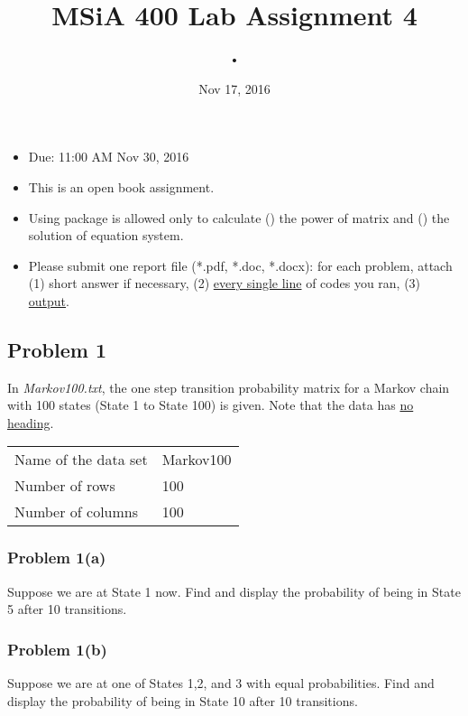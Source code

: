 \documentclass{article}
\author{•}
\title{MSiA 400 Lab Assignment 4} %
\date{Nov 17, 2016}
\newcommand{\rmnum}[1]{\romannumeral #1}
\begin{document}
\maketitle

\begin{itemize}
\item Due: 11:00 AM Nov 30, 2016
\item This is an open book assignment. 
\item Using package is allowed only to calculate (\rmnum{1}) the power of matrix and (\rmnum{2}) the solution of equation system.
\item Please submit one report file (*.pdf, *.doc, *.docx): for each problem, attach (1) short answer if necessary, (2) \underline{every single line} of codes you ran, (3) \underline{output}.
\end{itemize}
\vspace{0.5cm}


\subsection*{Problem 1}

In \textit{Markov100.txt}, the one step transition probability matrix for a Markov chain with 100 states (State 1 to State 100) is given. Note that the data has \underline{no heading}.
\vspace{0.2cm}

\begin{tabular}{ll}
Name of the data set & Markov100\\
Number of rows & 100\\
Number of columns & 100
\end{tabular}


\subsubsection*{Problem 1(a)}
Suppose we are at State 1 now. Find and display the probability of being in State 5 after 10 transitions. 






\subsubsection*{Problem 1(b)}
Suppose we are at one of States 1,2, and 3 with equal probabilities. Find and display the probability of being in State 10 after 10 transitions.
\end{document}
